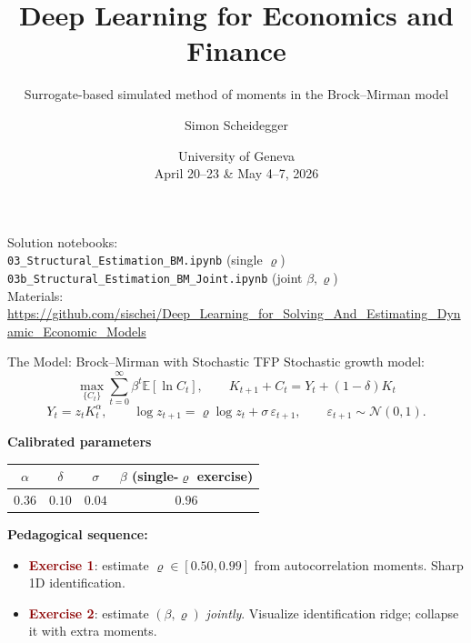\documentclass[10pt,aspectratio=169]{beamer}
\title[Deep Learning -- Geneva 2026]%
{Deep Learning for Economics and Finance}
\subtitle{Surrogate-based simulated method of moments in the Brock--Mirman model}
\author{Simon Scheidegger}
\institute[HEC Lausanne]{HEC, University of Lausanne}
\date{University of Geneva\\April 20--23 \& May 4--7, 2026}
\newcommand{\E}[1]{\mathbb{E}\!\left[#1\right]}
\newcommand{\emphc}[1]{\textbf{\textcolor{darkred}{#1}}}
\begin{document}
{
\begin{frame}
\titlepage
\vspace{-0.3cm}
\begin{center}
{\footnotesize Solution notebooks:}\\[1pt]
{\footnotesize \texttt{03\_Structural\_Estimation\_BM.ipynb} (single $\varrho$)}\\
{\footnotesize \texttt{03b\_Structural\_Estimation\_BM\_Joint.ipynb} (joint $\beta,\varrho$)}\\[2pt]
{\footnotesize Materials: \url{https://github.com/sischei/Deep_Learning_for_Solving_And_Estimating_Dynamic_Economic_Models}}
\end{center}
\end{frame}
}

\begin{frame}{The Model: Brock--Mirman with Stochastic TFP}
\small
Stochastic growth model:
\vspace{-4pt}
\[
\max_{\{C_t\}} \sum_{t=0}^{\infty} \beta^t \E{\ln C_t}, \qquad
K_{t+1} + C_t = Y_t + (1-\delta)K_t
\]
\vspace{-12pt}
\[
Y_t = z_t K_t^\alpha, \qquad \log z_{t+1} = \varrho\log z_t + \sigma\,\varepsilon_{t+1}, \qquad \varepsilon_{t+1}\sim\mathcal{N}(0,1).
\]

\textbf{Calibrated parameters}
\begin{center}\begin{tabular}{cccc}
\toprule
$\alpha$ & $\delta$ & $\sigma$ & $\beta$ (single-$\varrho$ exercise) \\
\midrule
$0.36$ & $0.10$ & $0.04$ & $0.96$ \\
\bottomrule
\end{tabular}\end{center}

\textbf{Pedagogical sequence:}
\begin{itemize}
\itemsep0pt
\item \emphc{Exercise 1}: estimate $\varrho \in [0.50, 0.99]$ from autocorrelation moments. Sharp 1D identification.
\item \emphc{Exercise 2}: estimate $(\beta, \varrho)$ \emph{jointly}. Visualize identification ridge; collapse it with extra moments.
\end{itemize}
\end{frame}
\end{document}
